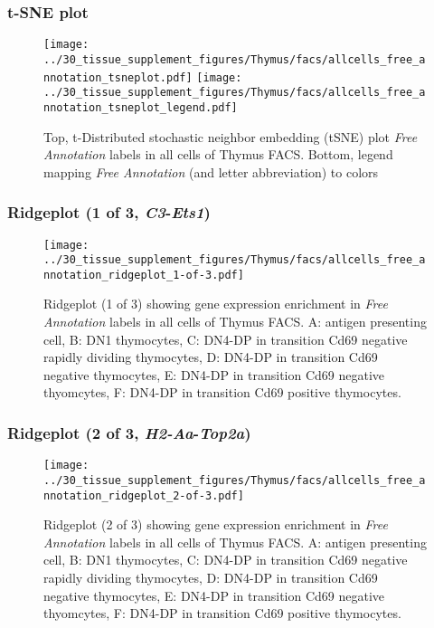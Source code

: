 \clearpage
\subsubsection{t-SNE plot}
\begin{figure}[h]
\centering
\texttt{[image: ../30\_tissue\_supplement\_figures/Thymus/facs/allcells\_free\_annotation\_tsneplot.pdf]}
\texttt{[image: ../30\_tissue\_supplement\_figures/Thymus/facs/allcells\_free\_annotation\_tsneplot\_legend.pdf]}
\caption{Top, t-Distributed stochastic neighbor embedding (tSNE) plot  \emph{Free Annotation} labels in all cells of Thymus FACS. Bottom, legend mapping \emph{Free Annotation} (and letter abbreviation) to colors}
\end{figure}


\clearpage

\subsubsection{Ridgeplot (1 of 3, \emph{C3}-\emph{Ets1})}
\begin{figure}[h]
\centering
\texttt{[image: ../30\_tissue\_supplement\_figures/Thymus/facs/allcells\_free\_annotation\_ridgeplot\_1-of-3.pdf]}

\caption{ Ridgeplot (1 of 3)  showing gene expression enrichment in \emph{Free Annotation} labels in all cells of Thymus FACS. A: antigen presenting cell, B: DN1 thymocytes, C: DN4-DP in transition Cd69 negative rapidly dividing thymocytes, D: DN4-DP in transition Cd69 negative thymocytes, E: DN4-DP in transition Cd69 negative thyomcytes, F: DN4-DP in transition Cd69 positive thymocytes.}
\end{figure}


\clearpage

\subsubsection{Ridgeplot (2 of 3, \emph{H2-Aa}-\emph{Top2a})}
\begin{figure}[h]
\centering
\texttt{[image: ../30\_tissue\_supplement\_figures/Thymus/facs/allcells\_free\_annotation\_ridgeplot\_2-of-3.pdf]}

\caption{ Ridgeplot (2 of 3)  showing gene expression enrichment in \emph{Free Annotation} labels in all cells of Thymus FACS. A: antigen presenting cell, B: DN1 thymocytes, C: DN4-DP in transition Cd69 negative rapidly dividing thymocytes, D: DN4-DP in transition Cd69 negative thymocytes, E: DN4-DP in transition Cd69 negative thyomcytes, F: DN4-DP in transition Cd69 positive thymocytes.}
\end{figure}



